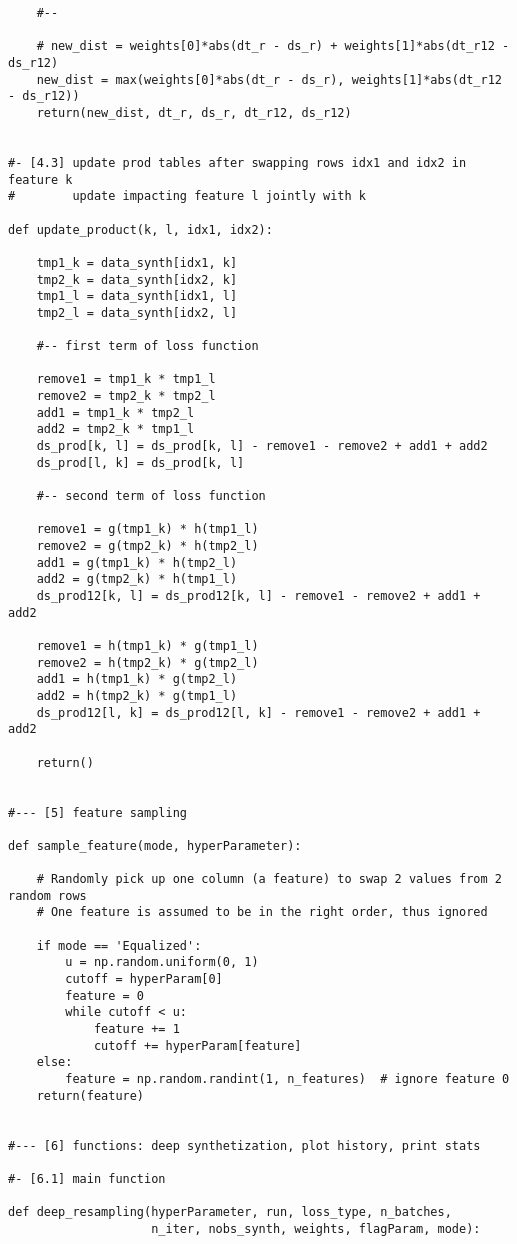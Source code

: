 \documentclass[oneside,10pt]{book}
\begin{document}
\begin{lstlisting}
    #--

    # new_dist = weights[0]*abs(dt_r - ds_r) + weights[1]*abs(dt_r12 - ds_r12)
    new_dist = max(weights[0]*abs(dt_r - ds_r), weights[1]*abs(dt_r12 - ds_r12))
    return(new_dist, dt_r, ds_r, dt_r12, ds_r12)


#- [4.3] update prod tables after swapping rows idx1 and idx2 in feature k
#        update impacting feature l jointly with k

def update_product(k, l, idx1, idx2):

    tmp1_k = data_synth[idx1, k]
    tmp2_k = data_synth[idx2, k]
    tmp1_l = data_synth[idx1, l]
    tmp2_l = data_synth[idx2, l]

    #-- first term of loss function

    remove1 = tmp1_k * tmp1_l
    remove2 = tmp2_k * tmp2_l
    add1 = tmp1_k * tmp2_l
    add2 = tmp2_k * tmp1_l
    ds_prod[k, l] = ds_prod[k, l] - remove1 - remove2 + add1 + add2
    ds_prod[l, k] = ds_prod[k, l]

    #-- second term of loss function

    remove1 = g(tmp1_k) * h(tmp1_l)
    remove2 = g(tmp2_k) * h(tmp2_l)
    add1 = g(tmp1_k) * h(tmp2_l)
    add2 = g(tmp2_k) * h(tmp1_l)
    ds_prod12[k, l] = ds_prod12[k, l] - remove1 - remove2 + add1 + add2

    remove1 = h(tmp1_k) * g(tmp1_l)
    remove2 = h(tmp2_k) * g(tmp2_l)
    add1 = h(tmp1_k) * g(tmp2_l)
    add2 = h(tmp2_k) * g(tmp1_l)
    ds_prod12[l, k] = ds_prod12[l, k] - remove1 - remove2 + add1 + add2

    return()


#--- [5] feature sampling

def sample_feature(mode, hyperParameter):

    # Randomly pick up one column (a feature) to swap 2 values from 2 random rows
    # One feature is assumed to be in the right order, thus ignored

    if mode == 'Equalized':
        u = np.random.uniform(0, 1)
        cutoff = hyperParam[0]
        feature = 0
        while cutoff < u:
            feature += 1
            cutoff += hyperParam[feature]
    else:
        feature = np.random.randint(1, n_features)  # ignore feature 0
    return(feature)


#--- [6] functions: deep synthetization, plot history, print stats

#- [6.1] main function

def deep_resampling(hyperParameter, run, loss_type, n_batches,
                    n_iter, nobs_synth, weights, flagParam, mode):


\end{lstlisting}
\end{document}
